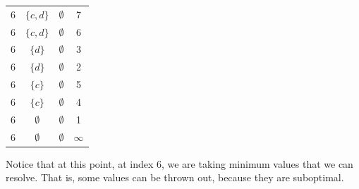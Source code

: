 \begin{minipage}{0.45\textwidth}
\begin{longtable}{|c|c|c|c|}
    6 & \( \{ c, d \} \) & \( \emptyset \) & 7 \\
    6 & \( \{ c, d \} \) & \( \emptyset \) & 6 \\
    6 & \( \{ d \} \) & \( \emptyset \) & 3 \\
    6 & \( \{ d \} \) & \( \emptyset \) & 2 \\

    6 & \( \{ c \} \) & \( \emptyset \) & 5 \\
    6 & \( \{ c \} \) & \( \emptyset \) & 4 \\
    6 & \( \emptyset \) & \( \emptyset \) & 1 \\
    6 & \( \emptyset \) & \( \emptyset \) & \( \infty \) \\

    \hline
    \end{longtable}
\end{minipage}

Notice that at this point, at index 6, we are taking minimum values that we can resolve. 
That is, some values can be thrown out, because they are suboptimal.

